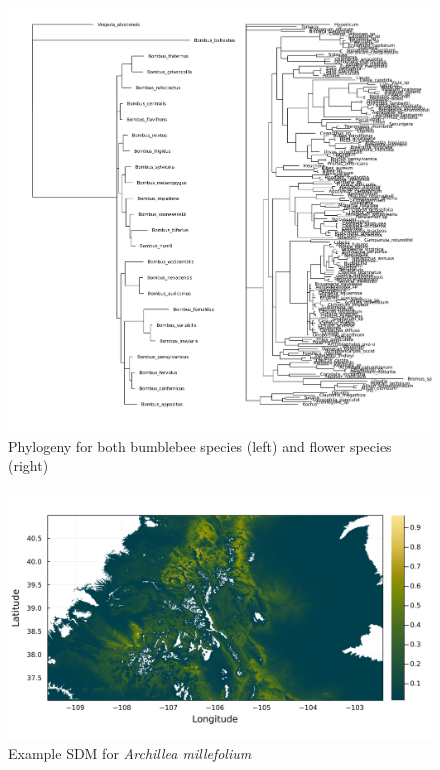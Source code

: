 \documentclass[11pt]{article}
\makeatletter
\def\maxwidth{\ifdim\Gin@nat@width>\linewidth\linewidth
\else\Gin@nat@width\fi}
\let\Oldincludegraphics\includegraphics
\renewcommand{\includegraphics}[1]{\Oldincludegraphics[width=\maxwidth]{#1}}
\makeatother
\begin{document}
\begin{figure}
\hypertarget{fig:phylo}{%
\centering
\includegraphics{./figures/trees.png}
\caption{Phylogeny for both bumblebee species (left) and flower species
(right)}\label{fig:phylo}
}
\end{figure}

\begin{figure}
\hypertarget{fig:example_sdm}{%
\centering
\includegraphics{./figures/sample_sdm.png}
\caption{Example SDM for \emph{Archillea
millefolium}}\label{fig:example_sdm}
}
\end{figure}
\end{document}
